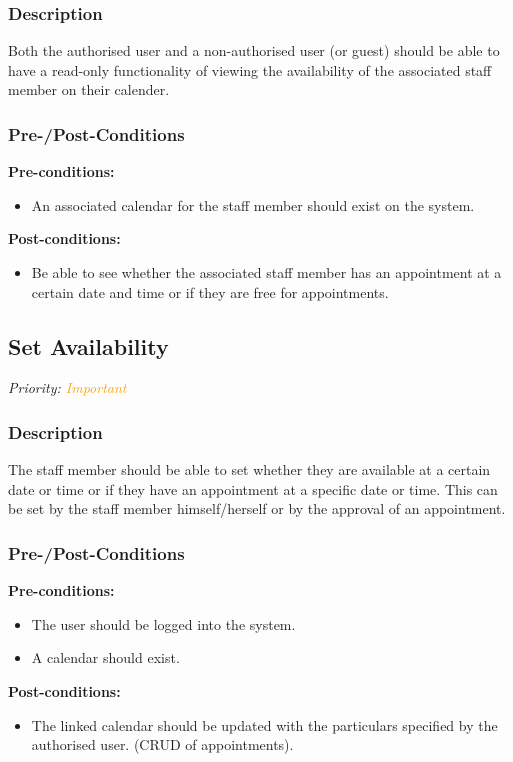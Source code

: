 	\subsubsection{Description}
	Both the authorised user and a non-authorised user (or guest) should be able to have a read-only functionality of viewing the availability of the associated staff member on their calender.
	\subsubsection{Pre-/Post-Conditions}
		\textbf{Pre-conditions:} 
			\begin{itemize}
				\item An associated calendar for the staff member should exist on the system. 
			\end{itemize}
		\textbf{Post-conditions:} 
			\begin{itemize}
				\item Be able to see whether the associated staff member has an appointment at a certain date and time or if they are free for appointments. 
			\end{itemize}
	
\subsection{Set Availability}
\textit{Priority: \textcolor{orange}{Important}}
	\subsubsection{Description}
	The staff member should be able to set whether they are available at a certain date or time or if they have an appointment at a specific date or time. This can be set by the staff member himself/herself or by the approval of an appointment.
	\subsubsection{Pre-/Post-Conditions}
		\textbf{Pre-conditions:} 
		\begin{itemize}
			\item The user should be logged into the system.
		 	\item A calendar should exist.
		\end{itemize}
		\textbf{Post-conditions:} 
			\begin{itemize}
				\item The linked calendar should be updated with the particulars specified by the authorised user. (CRUD of appointments).
			\end{itemize}